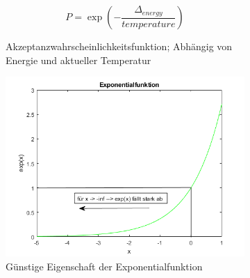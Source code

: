\begin{figure}[H]
    \centering
    \begin{subfigure}[b]{0.4\textwidth}
        \begin{tcolorbox}[rightrule=3mm, rounded corners=east]
            \begin{equation}\label{eq:Akzeptanzwahrscheinlichkeitsfunktion}
                P = \exp(-\frac{\Delta_{energy}}{temperature})
            \end{equation}
        \end{tcolorbox}
        \caption{Akzeptanzwahrscheinlichkeitsfunktion; Abhängig von Energie und aktueller Temperatur}
    \end{subfigure}
    \begin{subfigure}[b]{0.7\textwidth}
        \centering \includegraphics[interpolate=false,width=\linewidth]{content/simulatedAnnealing/Bilder/exponentialfunktion_as_PDF.png}
        \caption{Günstige Eigenschaft der Exponentialfunktion}
        \label{fig:Exponentialfunktion}
    \end{subfigure}
    \caption{}
\end{figure}

